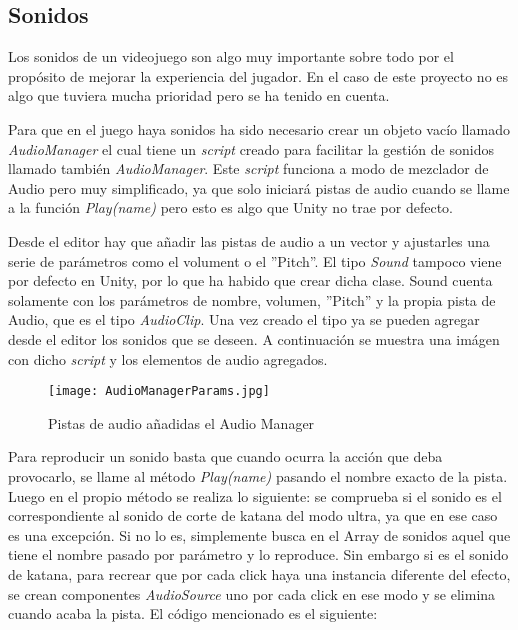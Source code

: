 \subsection{Sonidos}

Los sonidos de un videojuego son algo muy importante sobre todo por el propósito de mejorar la experiencia del jugador. En el caso de este proyecto no es algo que tuviera mucha prioridad pero se ha tenido en cuenta. 

Para que en el juego haya sonidos ha sido necesario crear un objeto vacío llamado \textit{AudioManager} el cual tiene un \textit{script} creado para facilitar la gestión de sonidos llamado también \textit{AudioManager}. Este \textit{script} funciona a modo de mezclador de Audio pero muy simplificado, ya que solo iniciará pistas de audio cuando se llame a la función \textit{Play(name)} pero esto es algo que Unity no trae por defecto.

Desde el editor hay que añadir las pistas de audio a un vector y ajustarles una serie de parámetros como el volument o el ''Pitch''. El tipo \textit{Sound} tampoco viene por defecto en Unity, por lo que ha habido que crear dicha clase. Sound cuenta solamente con los parámetros de nombre, volumen, ''Pitch'' y la propia pista de Audio, que es el tipo \textit{AudioClip}. Una vez creado el tipo ya se pueden agregar desde el editor los sonidos que se deseen. A continuación se muestra una imágen con dicho \textit{script} y los elementos de audio agregados.

\begin{figure}[H]
    \centering
    \texttt{[image: AudioManagerParams.jpg]}
    \caption{Pistas de audio añadidas el Audio Manager}
\end{figure}

Para reproducir un sonido basta que cuando ocurra la acción que deba provocarlo, se llame al método \textit{Play(name)} pasando el nombre exacto de la pista. Luego en el propio método se realiza lo siguiente: se comprueba si el sonido es el correspondiente al sonido de corte de katana del modo ultra, ya que en ese caso es una excepción. Si no lo es, simplemente busca en el Array de sonidos aquel que tiene el nombre pasado por parámetro y lo reproduce. Sin embargo si es el sonido de katana, para recrear que por cada click haya una instancia diferente del efecto, se crean componentes \textit{AudioSource} uno por cada click en ese modo y se elimina cuando acaba la pista. El código mencionado es el siguiente: 

